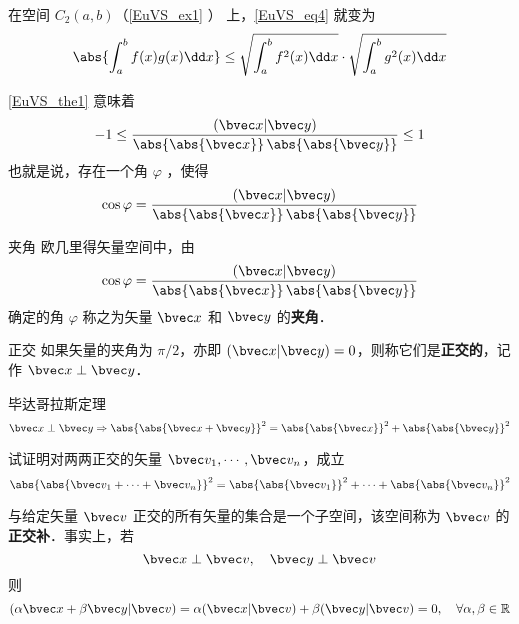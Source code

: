 \begin{example}{}
在空间 $C_2(a,b)$（\autoref{EuVS_ex1} ） 上，\autoref{EuVS_eq4} 就变为
\begin{equation}
\abs{\int_a^b f(x)g(x)\dd x}\leq\sqrt{\int_a^b f^2(x)\dd x}\cdot\sqrt{\int_a^b g^2(x)\dd x}
\end{equation}
\end{example}
\autoref{EuVS_the1} 意味着
\begin{equation}
-1\leq\frac{(\bvec x|\bvec y)}{\abs{\abs{\bvec x}}\,\abs{\abs{\bvec y}}}\leq1
\end{equation}
也就是说，存在一个角 $\varphi$ ，使得
\begin{equation}
\cos\varphi=\frac{(\bvec x|\bvec y)}{\abs{\abs{\bvec x}}\,\abs{\abs{\bvec y}}}
\end{equation}
\begin{definition}{夹角}\label{EuVS_def3}
欧几里得矢量空间中，由
\begin{equation}
\cos\varphi=\frac{(\bvec x|\bvec y)}{\abs{\abs{\bvec x}}\,\abs{\abs{\bvec y}}}
\end{equation}
确定的角 $\varphi$ 称之为矢量 $\bvec x$ 和 $\bvec y$ 的\textbf{夹角}． 
\end{definition}
\begin{definition}{正交}
如果矢量的夹角为 $\pi/2$，亦即 $(\bvec x|\bvec y)=0$，则称它们是\textbf{正交的}，记作 $\bvec x\perp\bvec y$．
\end{definition}
\begin{theorem}{毕达哥拉斯定理}
\begin{equation}
\bvec x\perp\bvec y\Rightarrow\abs{\abs{\bvec x+\bvec y}}^2=\abs{\abs{\bvec x}}^2+\abs{\abs{\bvec y}}^2
\end{equation}
\end{theorem}
\begin{exercise}{}
试证明对两两正交的矢量 $\bvec v_1,\cdots,\bvec v_n$，成立
\begin{equation}
\abs{\abs{\bvec v_1+\cdots+\bvec v_n}}^2=\abs{\abs{\bvec v_1}}^2+\cdots+\abs{\abs{\bvec v_n}}^2
\end{equation}
\end{exercise}
\begin{example}{}
与给定矢量 $\bvec v$ 正交的所有矢量的集合是一个子空间，该空间称为 $\bvec v$ 的\textbf{正交补}．事实上，若
\begin{equation}
\bvec x\perp\bvec v,\quad\bvec y\perp\bvec v
\end{equation}
则
\begin{equation}
(\alpha\bvec x+\beta\bvec y|\bvec v)=\alpha(\bvec x|\bvec v)+\beta(\bvec y|\bvec v)=0,\quad \forall\alpha,\beta\in\mathbb R
\end{equation}
\end{example}
